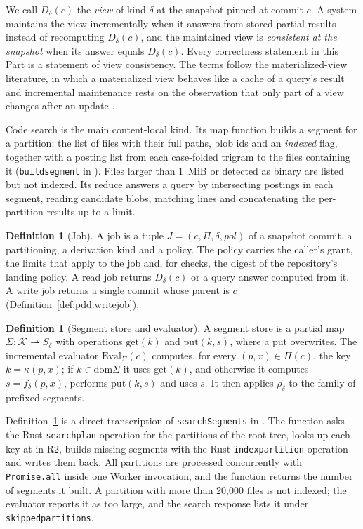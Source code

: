 \documentclass[11pt,letterpaper]{article}
\theoremstyle{definition}
\newtheorem{definition}[theorem]{Definition}
\theoremstyle{remark}
\newcommand{\Keys}{\mathcal{K}}
\newcommand{\Eval}{\mathrm{Eval}}
\newcommand{\dom}{\mathrm{dom}}
\DeclareRobustCommand{\code}[1]{{\def\_{\textunderscore\allowbreak}\texttt{#1}}}
\begin{document}
We call $D_\delta(c)$ the \emph{view} of kind $\delta$ at the snapshot pinned at commit $c$. A system maintains the view incrementally when it answers from stored partial results instead of recomputing $D_\delta(c)$, and the maintained view is \emph{consistent at the snapshot} when its answer equals $D_\delta(c)$. Every correctness statement in this Part is a statement of view consistency. The terms follow the materialized-view literature, in which a materialized view behaves like a cache of a query's result and incremental maintenance rests on the observation that only part of a view changes after an update \cite[Section~1]{gupta1995maintenance}.

Code search is the main content-local kind. Its map function builds a segment for a partition: the list of files with their full paths, blob ids and an \emph{indexed} flag, together with a posting list from each case-folded trigram to the files containing it (\code{build\_segment} in ). Files larger than 1~MiB or detected as binary are listed but not indexed. Its reduce answers a query by intersecting postings in each segment, reading candidate blobs, matching lines and concatenating the per-partition results up to a limit.

\begin{definition}[Job]
\label{def:pdd:job}
A job is a tuple $J=(c,\Pi,\delta,\mathit{pol})$ of a snapshot commit, a partitioning, a derivation kind and a policy. The policy carries the caller's grant, the limits that apply to the job and, for checks, the digest of the repository's landing policy. A read job returns $D_\delta(c)$ or a query answer computed from it. A write job returns a single commit whose parent is $c$ (Definition~\ref{def:pdd:writejob}).
\end{definition}

\begin{definition}[Segment store and evaluator]
\label{def:pdd:segment-store}
A segment store is a partial map $\Sigma:\Keys\rightharpoonup S_\delta$ with operations $\mathrm{get}(k)$ and $\mathrm{put}(k,s)$, where a put overwrites. The incremental evaluator $\Eval_\Sigma(c)$ computes, for every $(p,x)\in\Pi(c)$, the key $k=\kappa(p,x)$; if $k\in\dom\Sigma$ it uses $\mathrm{get}(k)$, and otherwise it computes $s=f_\delta(p,x)$, performs $\mathrm{put}(k,s)$ and uses $s$. It then applies $\rho_\delta$ to the family of prefixed segments.
\end{definition}

Definition~\ref{def:pdd:segment-store} is a direct transcription of \code{searchSegments} in . The function asks the Rust \code{search\_plan} operation for the partitions of the root tree, looks up each key at  in R2, builds missing segments with the Rust \code{index\_partition} operation and writes them back. All partitions are processed concurrently with \code{Promise.all} inside one Worker invocation, and the function returns the number of segments it built. A partition with more than 20,000 files is not indexed; the evaluator reports it as too large, and the search response lists it under \code{skipped\_partitions}.
\end{document}
